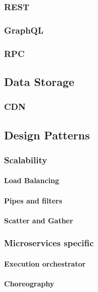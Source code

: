 \documentclass[a4paper, 11pt]{book}
\begin{document}
    \subsubsection{REST}

    \subsubsection{GraphQL}

    \subsubsection{RPC}

    \subsection{Data Storage}

    \subsubsection{CDN}

    \subsection{Design Patterns}
    \lipsum[4]
    \subsubsection{Scalability}
    \paragraph{Load Balancing}
    \paragraph{Pipes and filters}
    \paragraph{Scatter and Gather}
    \subsubsection{Microservices specific}
    \paragraph{Execution orchestrator}
    \paragraph{Choreography}
    
\end{document}
